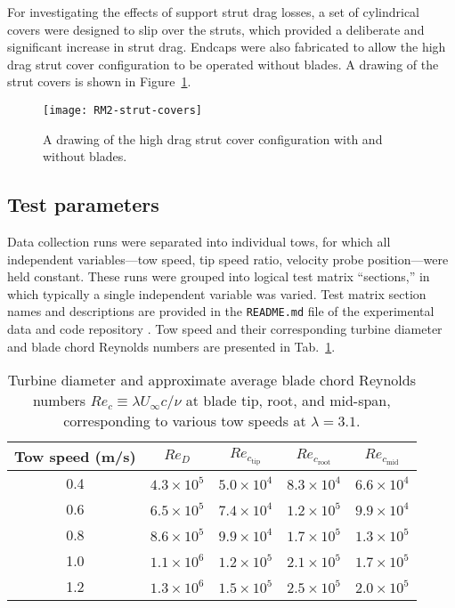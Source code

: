 For investigating the effects of support strut drag losses, a set of cylindrical
covers were designed to slip over the struts, which provided a deliberate and
significant increase in strut drag. Endcaps were also fabricated to allow the
high drag strut cover configuration to be operated without blades. A drawing of
the strut covers is shown in Figure~\ref{fig:covers}.

\begin{figure}
    \centering

    \texttt{[image: RM2-strut-covers]}
    
    \caption{A drawing of the high drag strut cover configuration with and
        without blades.}
    
    \label{fig:covers}
\end{figure}


\subsection{Test parameters}

Data collection runs were separated into individual tows, for which all
independent variables---tow speed, tip speed ratio, velocity probe
position---were held constant. These runs were grouped into logical test matrix
``sections,'' in which typically a single independent variable was varied. Test
matrix section names and descriptions are provided in the \texttt{README.md}
file of the experimental data and code repository \cite{Bachant2016-RM2-data}.
Tow speed and their corresponding turbine diameter and blade chord Reynolds
numbers are presented in Tab.~\ref{tab:re}.

\begin{table}
    \centering
    \begin{tabular}{c|c|c|c|c}
        Tow speed (m/s) & $Re_D$ & $Re_{c_\mathrm{tip}}$ & $Re_{c_\mathrm{root}}$ & $Re_{c_\mathrm{mid}}$\\
        \hline
        0.4 & $4.3 \times 10^5$ & $5.0 \times 10^4$ & $8.3 \times 10^4$ & $6.6 \times 10^4$ \\
        0.6 & $6.5 \times 10^5$ & $7.4 \times 10^4$ & $1.2 \times 10^5$ & $9.9 \times 10^4$ \\
        0.8 & $8.6 \times 10^5$ & $9.9 \times 10^4$ & $1.7 \times 10^5$ & $1.3 \times 10^5$ \\
        1.0 & $1.1 \times 10^6$ & $1.2 \times 10^5$ & $2.1 \times 10^5$ & $1.7 \times 10^5$ \\
        1.2 & $1.3 \times 10^6$ & $1.5 \times 10^5$ & $2.5 \times 10^5$ & $2.0 \times 10^5$ \\
    \end{tabular}
    
    \caption{Turbine diameter and approximate average blade chord Reynolds
        numbers $Re_c \equiv \lambda U_\infty c / \nu$ at blade tip, root, and
        mid-span, corresponding to various tow speeds at $\lambda=3.1$.}
    
    \label{tab:re}
\end{table}

